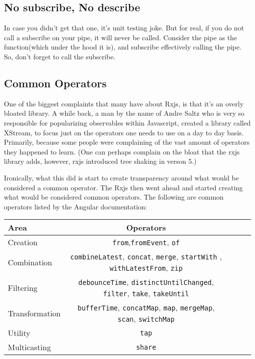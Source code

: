 \subsection{No subscribe, No describe}
In case you didn't get that one, it's unit testing joke. But for real, if you 
do not call a subscribe on your pipe, it will never be called. Consider the 
pipe as the function(which under the hood it is), and subscribe effectively
calling the pipe. So, don't forget to call the subscribe. 

\subsection{Common Operators}
One of the biggest complaints that many have about Rxjs, is that it's an 
overly bloated library. A while back, a man by the name of Andre Saltz who is
very so responsible for popularizing observables within Javascript, created a 
library called XStream, to focus just on the operators one needs to use on a 
day to day basis. Primarily, because some people were complaining of the vast 
amount of operators they happened to learn. (One can perhaps complain on the 
bloat that the rxjs library adds, however, rxjs introduced tree shaking in 
verson 5.)

Ironically, what this did is start to create transparency around what would be 
considered a common operator. The Rxjs then went ahead and started creating 
what would be considered common operators. The following are common operators
listed by the Angular documentation:
  
\begin{center}
  \begin{tabular}{@{} l *4c @{}}
    \toprule
    {\color{red}Area} & Operators \\
    \midrule
    Creation & \texttt{from},\texttt{fromEvent}, \texttt{of}\tabularnewline
    Combination & \texttt{combineLatest}, \texttt{concat}, \texttt{merge},
  \texttt{startWith} , \texttt{withLatestFrom},
  \texttt{zip}\tabularnewline
  Filtering & \texttt{debounceTime}, \texttt{distinctUntilChanged},
  \texttt{filter}, \texttt{take}, \texttt{takeUntil}\tabularnewline
  Transformation & \texttt{bufferTime}, \texttt{concatMap}, \texttt{map},
  \texttt{mergeMap}, \texttt{scan}, \texttt{switchMap}\tabularnewline
  Utility & \texttt{tap}\tabularnewline
  Multicasting & \texttt{share}\tabularnewline
  \end{tabular}
\end{center}  

